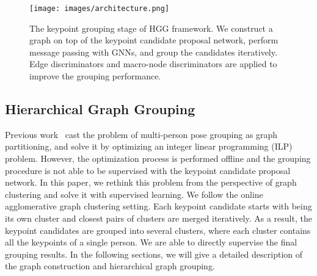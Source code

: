 \documentclass[runningheads]{llncs}
\begin{document}
	\begin{figure*}[t]
		\begin{center}
			\texttt{[image: images/architecture.png]}
		\end{center}
		\caption{The keypoint grouping stage of HGG framework. We construct a graph on top of the keypoint candidate proposal network, perform message passing with GNNs, and group the candidates iteratively. Edge discriminators and macro-node discriminators are applied to improve the grouping performance.}
		\label{fig:overall_framework}
	\end{figure*}
	
	\subsection{Hierarchical Graph Grouping}
	
	Previous work~\cite{Insafutdinov2016ArtTrack,Insafutdinov2016DeeperCut,Iqbal2016PoseTrack,pishchulin2016deepcut} cast the problem of multi-person pose grouping as graph partitioning, and solve it by optimizing an integer linear programming (ILP) problem. However, the optimization process is performed offline and the grouping procedure is not able to be supervised with the keypoint candidate proposal network. In this paper, we rethink this problem from the perspective of graph clustering and solve it with supervised learning. We follow the online agglomerative graph clustering setting. Each keypoint candidate starts with being its own cluster and closest pairs of clusters are merged iteratively. As a result, the keypoint candidates are grouped into several clusters, where each cluster contains all the keypoints of a single person. We are able to directly supervise the final grouping results. In the following sections, we will give a detailed description of the graph construction and hierarchical graph grouping. 
	
\end{document}
